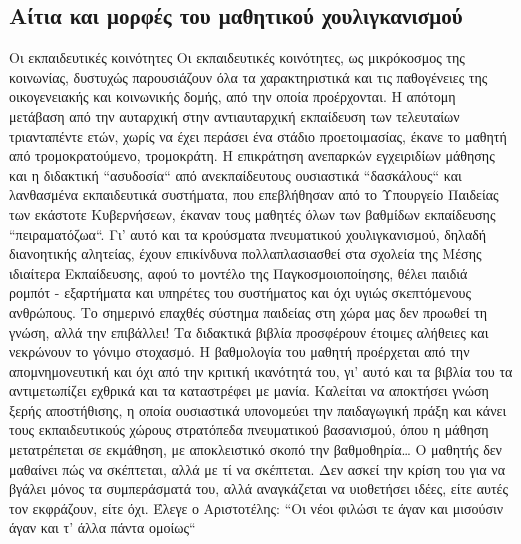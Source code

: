 \documentclass[12pt,a4paper]{book}
\begin{document}
\subsection*{Αίτια και μορφές του μαθητικού χουλιγκανισμού}
\setlength{\parindent}{20pt}\indent Οι εκπαιδευτικές κοινότητες
Οι εκπαιδευτικές κοινότητες, ως μικρόκοσμος της κοινωνίας, δυστυχώς παρουσιάζουν
όλα τα χαρακτηριστικά και τις παθογένειες της οικογενειακής και κοινωνικής
δομής, από την οποία προέρχονται. Η απότομη μετάβαση από την αυταρχική στην
αντιαυταρχική εκπαίδευση των τελευταίων τριανταπέντε ετών, χωρίς να έχει περάσει
ένα στάδιο προετοιμασίας, έκανε το μαθητή από  τρομοκρατούμενο, τρομοκράτη. Η
επικράτηση ανεπαρκών εγχειριδίων μάθησης και η διδακτική ``ασυδοσία`` από
ανεκπαίδευτους ουσιαστικά ``δασκάλους`` και λανθασμένα εκπαιδευτικά συστήματα,
που επεβλήθησαν από το Υπουργείο Παιδείας των εκάστοτε Κυβερνήσεων, έκαναν τους
μαθητές όλων των βαθμίδων εκπαίδευσης ``πειραματόζωα``. Γι' αυτό και τα
κρούσματα πνευματικού χουλιγκανισμού, δηλαδή διανοητικής αλητείας, έχουν
επικίνδυνα πολλαπλασιασθεί στα σχολεία της Μέσης ιδιαίτερα Εκπαίδευσης, αφού το
μοντέλο της Παγκοσμοιοποίησης, θέλει παιδιά ρομπότ - εξαρτήματα και υπηρέτες του
συστήματος και όχι υγιώς σκεπτόμενους ανθρώπους.
\newline\setlength{\parindent}{20pt}\indent Το σημερινό επαχθές σύστημα
παιδείας στη χώρα μας δεν προωθεί τη γνώση, αλλά την επιβάλλει! Τα διδακτικά βιβλία
προσφέρουν έτοιμες αλήθειες και νεκρώνουν το γόνιμο στοχασμό. Η βαθμολογία του
μαθητή προέρχεται από την απομνημονευτική και όχι από την κριτική ικανότητά του,
γι' αυτό και τα βιβλία του τα αντιμετωπίζει εχθρικά και τα καταστρέφει με μανία.
Καλείται να αποκτήσει γνώση ξερής αποστήθισης, η οποία ουσιαστικά υπονομεύει την
παιδαγωγική πράξη και κάνει τους εκπαιδευτικούς χώρους στρατόπεδα πνευματικού
βασανισμού, όπου η μάθηση μετατρέπεται σε εκμάθηση, με αποκλειστικό σκοπό την
βαθμοθηρία\ldots\vspace{6 mm} Ο μαθητής δεν μαθαίνει πώς να σκέπτεται, αλλά με
τί να σκέπτεται. Δεν ασκεί την κρίση του για να βγάλει μόνος τα συμπεράσματά
του, αλλά αναγκάζεται να υιοθετήσει ιδέες, είτε αυτές τον εκφράζουν, είτε
όχι.
\newline\setlength{\parindent}{20pt}\indent Έλεγε ο Αριστοτέλης: ``Οι νέοι φιλώσι τε άγαν και μισούσιν άγαν και τ' άλλα πάντα
ομοίως`` 
\end{document}
